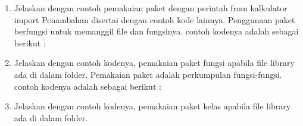 \begin{enumerate}
    \item Jelaskan dengan contoh pemakaian paket dengan perintah from kalkulator import Penambahan disertai dengan contoh kode lainnya.
Penggunaan paket berfungsi untuk memanggil file dan fungsinya. contoh kodenya adalah sebagai berikut :
 

    \item Jelaskan dengan contoh kodenya, pemakaian paket fungsi apabila file library ada di dalam folder.
 Pemakaian paket adalah perkumpulan fungsi-fungsi. contoh kodenya adalah sebagai berikut :
 

    \item Jelaskan dengan contoh kodenya, pemakaian paket kelas apabila file library ada di dalam folder.
 

\end{enumerate}


